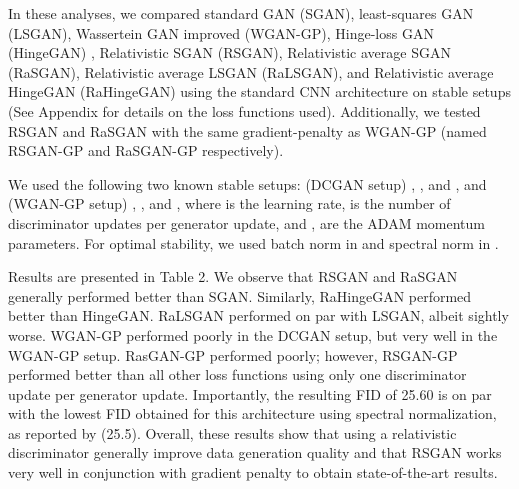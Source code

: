 \documentclass{article}
\begin{document}
In these analyses, we compared standard GAN (SGAN), least-squares GAN (LSGAN), Wassertein GAN improved (WGAN-GP), Hinge-loss GAN (HingeGAN) \citep{miyato2018spectral}, Relativistic SGAN (RSGAN), Relativistic average SGAN (RaSGAN), Relativistic average LSGAN (RaLSGAN), and Relativistic average HingeGAN (RaHingeGAN) using the standard CNN architecture on stable setups (See Appendix for details on the loss functions used). Additionally, we tested RSGAN and RaSGAN with the same gradient-penalty as WGAN-GP (named RSGAN-GP and RaSGAN-GP respectively). 

We used the following two known stable setups: (DCGAN setup) , ,  and  \citep{DCGAN}, and (WGAN-GP setup) , ,  and  \citep{WGAN-GP}, where  is the learning rate,  is the number of discriminator updates per generator update, and ,  are the ADAM momentum parameters. For optimal stability, we used batch norm \citep{BatchNorm} in  and spectral norm \citep{miyato2018spectral} in .

Results are presented in Table 2. We observe that RSGAN and RaSGAN generally performed better than SGAN. Similarly, RaHingeGAN performed better than HingeGAN. RaLSGAN performed on par with LSGAN, albeit sightly worse. WGAN-GP performed poorly in the DCGAN setup, but very well in the WGAN-GP setup. RasGAN-GP performed poorly; however, RSGAN-GP performed better than all other loss functions using only one discriminator update per generator update. Importantly, the resulting FID of 25.60 is on par with the lowest FID obtained for this architecture using spectral normalization, as reported by \citet{miyato2018spectral} (25.5). Overall, these results show that using a relativistic discriminator generally improve data generation quality and that RSGAN works very well in conjunction with gradient penalty to obtain state-of-the-art results.
\end{document}
